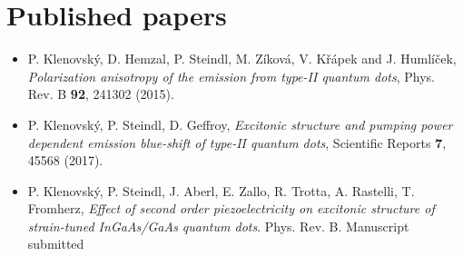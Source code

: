 \documentclass[
a4paper, %
11pt, %
onecolumn, %
openany, %
oldfontcommands,
]{memoir}
\begin{document}
\section*{Published papers}
\begin{itemize}
	\item P. Klenovský, D. Hemzal, P. Steindl, M. Zíková, V. Křápek and J. Humlíček, \textit{Polarization anisotropy of the emission from type-II quantum dots}, Phys. Rev. B \textbf{92}, 241302 (2015).
	
	\item P. Klenovský, P. Steindl, D. Geffroy, \textit{Excitonic structure and pumping power dependent emission blue-shift of type-II quantum dots}, Scientific Reports \textbf{7}, 45568 (2017).
	
	\item P. Klenovský, P. Steindl, J. Aberl, E. Zallo, R. Trotta, A. Rastelli, T. Fromherz, \textit{Effect of second order piezoelectricity on excitonic structure of strain-tuned InGaAs/GaAs quantum dots}. Phys. Rev. B. Manuscript submitted
\end{itemize}
\end{document}
